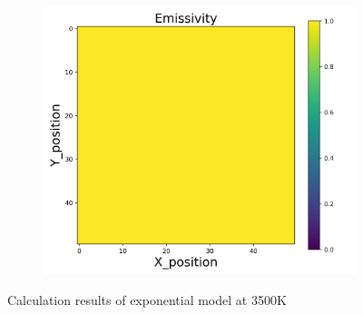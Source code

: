 \begin{figure}[htbp]
\begin{minipage}{\textwidth}
\begin{subfigure}{0.325\textwidth}
        \end{subfigure}
        \begin{subfigure}{0.325\textwidth}
            \centering
            \includegraphics[width=\textwidth]{figures/raw_data/5/T3500/exp/emi_cal.jpg}
        \end{subfigure}
    \end{minipage}
    \caption{Calculation results of exponential model at 3500K}
    \label{fig: result_exp_model_3500}
\end{figure}